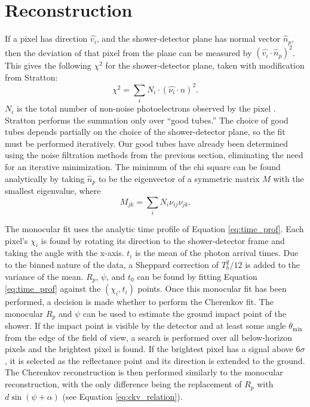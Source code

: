 \section{Reconstruction} \label{sec:recon}

If a pixel has direction $\hat{v_i}$, and the shower-detector plane has normal vector $\hat{n}_p$, then the deviation of that pixel from the plane can be measured by $(\hat{v_i} \cdot \hat{n}_p)^2$. This gives the following $\chi^2$ for the shower-detector plane, taken with modification from Stratton:
\begin{equation}
    \chi^2 = \sum_i  N_i \cdot (\hat{\nu_i} \cdot \hat{n})^2.
\end{equation}
$N_i$ is the total number of non-noise photoelectrons observed by the pixel \cite{stratton2012ta}. Stratton performs the summation only over ``good tubes.'' The choice of good tubes depends partially on the choice of the shower-detector plane, so the fit must be performed iteratively. Our good tubes have already been determined using the noise filtration methods from the previous section, eliminating the need for an iterative minimization. The minimum of the chi square can be found analytically by taking $\hat{n}_p$ to be the eigenvector of a symmetric matrix $M$ with the smallest eigenvalue, where
\begin{equation}
    M_{jk} = \sum_i  N_i \nu_{ij} \nu_{jk}.
\end{equation}

The monocular fit uses the analytic time profile of Equation \ref{eq:time_prof}. Each pixel's $\chi_i$ is found by rotating its direction to the shower-detector frame and taking the angle with the x-axis. $t_i$ is the mean of the photon arrival times. Due to the binned nature of the data, a Sheppard correction of $T_b^2 / 12$ is added to the variance of the mean. $R_p$, $\psi$, and $t_0$ can be found by fitting Equation \ref{eq:time_prof} against the $(\chi_i, t_i)$ points. Once this monocular fit has been performed, a decision is made whether to perform the Cherenkov fit. The monocular $R_p$ and $\psi$ can be used to estimate the ground impact point of the shower. If the impact point is visible by the detector and at least some angle $\theta_\text{min}$ from the edge of the field of view, a search is performed over all below-horizon pixels and the brightest pixel is found. If the brightest pixel has a signal above $6\sigma$, it is selected as the reflectance point and its direction is extended to the ground. The Cherenkov reconstruction is then performed similarly to the monocular reconstruction, with the only difference being the replacement of $R_p$ with $d \sin(\psi + \alpha)$ (see Equation \ref{eq:ckv_relation}).